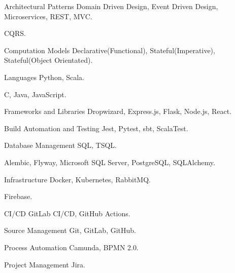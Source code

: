   \begin{cvskills}
    \cvskill
      {Architectural Patterns}
      { Domain Driven Design, Event Driven Design, Microservices, REST, MVC.}

    \cvskill
      {}
      { CQRS.}

    \cvskill
      {Computation Models}
      { Declarative(Functional), Stateful(Imperative), Stateful(Object Orientated).}

    \cvskill
      {Languages}
      { Python, Scala.}

    \cvskill
      {}
      { C, Java, JavaScript.}

    \cvskill
      {Frameworks and Libraries}
      { Dropwizard, Express.js, Flask, Node.js, React.}

    \cvskill
      {Build Automation and Testing}
      { Jest, Pytest, sbt, ScalaTest.}

    \cvskill
      {Database Management}
      { SQL, TSQL.}

    \cvskill
      {}
      { Alembic, Flyway, Microsoft SQL Server, PostgreSQL, SQLAlchemy.}

    \cvskill
      {Infrastructure}
      { Docker, Kubernetes, RabbitMQ.}

    \cvskill
      {}
      { Firebase.}

    \cvskill
      {CI/CD}
      { GitLab CI/CD, GitHub Actions.}

    \cvskill
      {Source Management}
      { Git, GitLab, GitHub.}

    \cvskill
      {Process Automation}
      { Camunda, BPMN 2.0.}

    \cvskill
      {Project Management}
      { Jira.}
  \end{cvskills}
